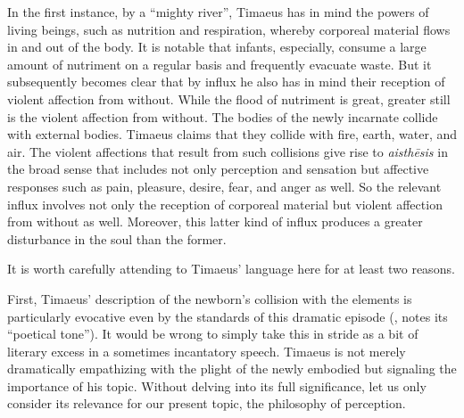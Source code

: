 In the first instance, by a ``mighty river'', Timaeus has in mind the powers of living beings, such as nutrition and respiration, whereby corporeal material flows in and out of the body. It is notable that infants, especially, consume a large amount of nutriment on a regular basis and frequently evacuate waste.  But it subsequently becomes clear that by influx he also has in mind their reception of violent affection from without. While the flood of nutriment is great, greater still is the violent affection from without. The bodies of the newly incarnate collide with external bodies. Timaeus claims that they collide with fire, earth, water, and air. The violent affections that result from such collisions give rise to \emph{aisthēsis} in the broad sense that includes not only perception and sensation but affective responses such as pain, pleasure, desire, fear, and anger as well. So the relevant influx involves not only the reception of corporeal material but violent affection from without as well. Moreover, this latter kind of influx produces a greater disturbance in the soul than the former.

It is worth carefully attending to Timaeus' language here for at least two reasons.

First, Timaeus' description of the newborn's collision with the elements is particularly evocative even by the standards of this dramatic episode (\citealt[149 n10]{Archer-Hind:1888qd}, notes its ``poetical tone''). It would be wrong to simply take this in stride as a bit of literary excess in a sometimes incantatory speech. Timaeus is not merely dramatically empathizing with the plight of the newly embodied but signaling the importance of his topic. Without delving into its full significance, let us only consider its relevance for our present topic, the philosophy of perception. 

